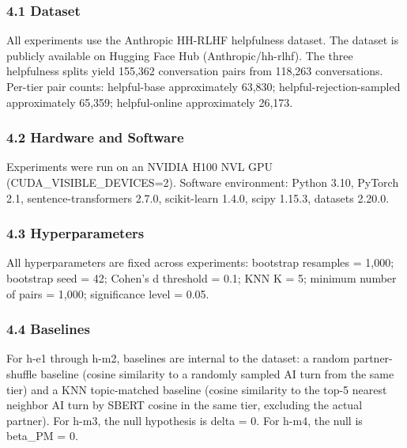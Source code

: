 
\subsubsection{4.1 Dataset}

All experiments use the Anthropic HH-RLHF helpfulness dataset. The dataset is publicly available on Hugging Face Hub (Anthropic/hh-rlhf). The three helpfulness splits yield 155,362 conversation pairs from 118,263 conversations. Per-tier pair counts: helpful-base approximately 63,830; helpful-rejection-sampled approximately 65,359; helpful-online approximately 26,173.

\subsubsection{4.2 Hardware and Software}

Experiments were run on an NVIDIA H100 NVL GPU (CUDA\_VISIBLE\_DEVICES=2). Software environment: Python 3.10, PyTorch 2.1, sentence-transformers 2.7.0, scikit-learn 1.4.0, scipy 1.15.3, datasets 2.20.0.

\subsubsection{4.3 Hyperparameters}

All hyperparameters are fixed across experiments: bootstrap resamples = 1,000; bootstrap seed = 42; Cohen's d threshold = 0.1; KNN K = 5; minimum number of pairs = 1,000; significance level = 0.05.

\subsubsection{4.4 Baselines}

For h-e1 through h-m2, baselines are internal to the dataset: a random partner-shuffle baseline (cosine similarity to a randomly sampled AI turn from the same tier) and a KNN topic-matched baseline (cosine similarity to the top-5 nearest neighbor AI turn by SBERT cosine in the same tier, excluding the actual partner). For h-m3, the null hypothesis is delta = 0. For h-m4, the null is beta\_PM = 0.
